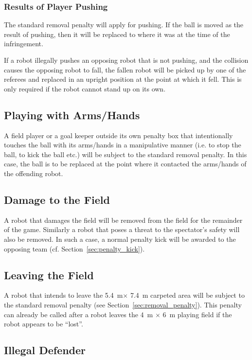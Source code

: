 \documentclass[12pt]{article}
\newcommand{\cf}{\mbox{cf.}\xspace}
\newcommand{\TotalWidth}{5.4~m\xspace}
\newcommand{\TotalLength}{7.4~m\xspace }
\begin{document}
\subsubsection{Results of Player Pushing}

The standard removal penalty will apply for pushing. If the ball is moved as the result of pushing, then it will be replaced to where it was at the time of the infringement.

If a robot illegally pushes an opposing robot that is not pushing, and the collision causes the opposing robot to fall, the fallen robot will be picked up by one of the referees and replaced in an upright position at the point at which it fell. This is only required if the robot cannot stand up on its own.

\subsection{Playing with Arms/Hands}
\label{sec:hand_ball}

A field player or a goal keeper outside its own penalty box that intentionally touches the ball with its arms/hands in a manipulative manner (i.e. to stop the ball, to kick the ball etc.) will be subject to the standard removal penalty. In this case, the ball is to be replaced at the point where it contacted the arms/hands of the offending robot.

\subsection{Damage to the Field}

A robot that damages the field will be removed from the field for the remainder of the game. Similarly a robot that poses a threat to the spectator's safety will also be removed. In such a case, a normal penalty kick will be awarded to the opposing team (\cf Section~\ref{sec:penalty_kick}).

\subsection{Leaving the Field}

A robot that intends to leave the \TotalWidth $\times$ \TotalLength carpeted area will be subject to the standard removal penalty (see
Section~\ref{sec:removal_penalty}). This penalty can already be called after a robot leaves the 4~m $\times$ 6~m playing field if the robot appears to be ``lost''.

\subsection{Illegal Defender}
\end{document}

